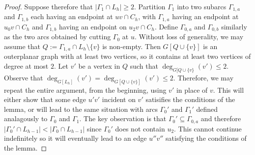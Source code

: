 \documentclass{patmorin}
\DeclareMathOperator{\height}{height}
\DeclareMathOperator{\depth}{depth}
\begin{document}
\begin{proof}
  Suppose therefore that $|\Gamma_1\cap L_h|\ge 2$.  Partition $\Gamma_1$ into two subarcs $\Gamma_{1,a}$ and $\Gamma_{1,b}$ each having an endpoint at $uv\cap C_h$, with $\Gamma_{1,a}$ having an endpoint at $u_0v\cap C_h$ and $\Gamma_{1,b}$ having an endpoint on $u_2v\cap C_h$.   Define $\Gamma_{0,a}$ and $\Gamma_{0,b}$ similarly as the two arcs obtained by cutting $\Gamma_0$ at $u$.  Without loss of generality, we may assume that $Q:=\Gamma_{1,a}\cap L_h\setminus\{v\}$ is non-empty.  Then $G[Q\cup\{v\}]$ is an outerplanar graph with at least two vertices, so it contains at least two vertices of degree at most $2$.  Let $v'$ be a vertex in $Q$ such that $\deg_{G[Q\cup\{v\}}(v')\le 2$.  Observe that $\deg_{G[L_h]}(v')=\deg_{G[Q\cup\{v\}]}(v')\le 2$.  Therefore, we may repeat the entire argument, from the beginning, using $v'$ in place of $v$.  This will either show that some edge $u'v'$ incident on $v'$ satisifies the conditions of the lemma, or will lead to the same situation with arcs $\Gamma_0'$ and $\Gamma_1'$ defined analagously to $\Gamma_0$ and $\Gamma_1$.  The key observation is that $\Gamma_0'\subseteq\Gamma_{0,a}$ and therefore $|\Gamma_0'\cap L_{h-1}| < |\Gamma_0\cap L_{h-1}|$ since $\Gamma_0'$ does not contain $u_2$.  This cannot continue indefinitely so it will eventually lead to an edge $u''v''$ satisfying the conditions of the lemma.
\end{proof}



%
%
\end{document}
